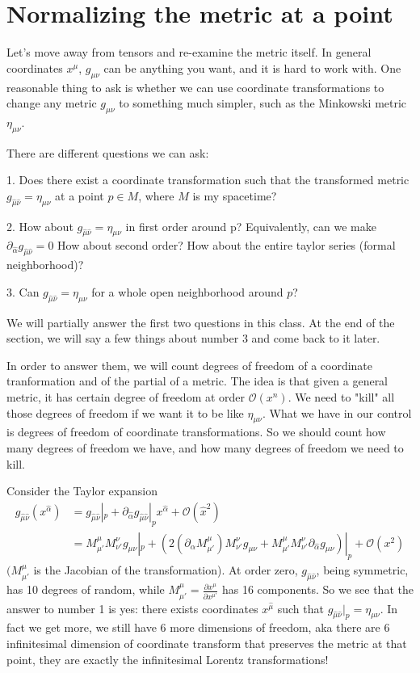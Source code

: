 \documentclass[10pt]{article}
\newcommand{\xm}{x^\mu}
\newcommand{\xmp}{x^{\mu'}}
\newcommand{\gmn}{g_{\mu \nu}}
\newcommand{\gmnhat}{g_{\hat{\mu} \hat{\nu}}}
\newcommand{\emn}{\eta_{\mu \nu}}
\begin{document}
\section{Normalizing the metric at a point}\label{sec:class_style}

Let's move away from tensors and re-examine the metric itself. In general coordinates $\xm$, $\gmn$ can be anything you want, and it is hard to work with. One reasonable thing to ask is whether we can use coordinate transformations to change any metric $\gmn$ to something much simpler, such as the Minkowski metric $\emn$.

There are different questions we can ask:

1. Does there exist a coordinate transformation such that the transformed metric $\gmnhat = \emn$ at a point $p \in M$, where $M$ is my spacetime?

2. How about $\gmnhat = \emn$ in first order around p? Equivalently, can we make $\partial_{\hat{\alpha}} \gmnhat = 0$ How about second order? How about the entire taylor series (formal neighborhood)?

3. Can $\gmnhat= \emn$ for a whole open neighborhood around $p$?

We will partially answer the first two questions in this class. At the end of the section, we will say a few things about number 3 and come back to it later.

In order to answer them, we will count degrees of freedom of a coordinate tranformation and of the partial of a metric. The idea is that given a general metric, it has certain degree of freedom at order $\mathcal{O}(x^n)$. We need to "kill" all those degrees of freedom if we want it to be like $\emn$. What we have in our control is degrees of freedom of coordinate transformations. So we should count how many degrees of freedom we have, and how many degrees of freedom we need to kill.

Consider the Taylor expansion
\begin{align*}
\gmnhat (x^{\hat{\alpha}}) & = \gmnhat|_p + \partial_{\hat{\alpha}} \gmnhat|_p x^{\hat{\alpha}} + \mathcal{O}(\hat{x}^2)
\\ &= M^{\mu}_{\mu'} M^{\nu}_{\nu'} \gmn|_p + (2 (\partial_{\alpha} M^{\mu}_{\mu'}) M^{\nu}_{\nu'} \gmn + M^{\mu}_{\mu'} M^{\nu}_{\nu'} \partial_{\hat{\alpha}} \gmn)|_p + \mathcal{O}(x^2)
\end{align*}
$ (M^{\mu}_{\mu'}$ is the Jacobian of the transformation). At order zero, $\gmnhat$, being symmetric, has 10 degrees of random, while $M^\mu _{\mu'} = \frac {\partial \xm}{\partial \xmp}$ has 16 components. So we see that the answer to number 1 is yes: there exists coordinates $x^{\hat{\mu}}$ such that $\gmnhat|_p  = \emn$. In fact we get more, we still have 6 more dimensions of freedom, aka there are 6 infinitesimal dimension of coordinate transform that preserves the metric at that point, they are exactly the infinitesimal Lorentz transformations!
\end{document}
